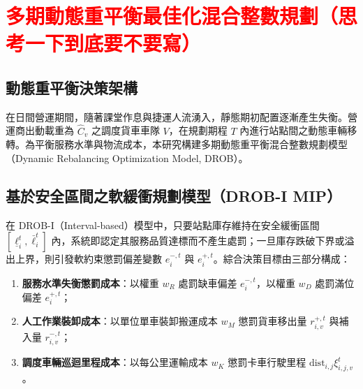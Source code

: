 \section{\textcolor{red}{多期動態重平衡最佳化混合整數規劃（思考一下到底要不要寫）}}

\subsection{動態重平衡決策架構}

在日間營運期間，隨著課堂作息與捷運人流湧入，靜態期初配置逐漸產生失衡。營運商出動載重為 $\hat{C}_v$ 之調度貨車車隊 $V$，在規劃期程 $T$ 內進行站點間之動態車輛移轉。為平衡服務水準與物流成本，本研究構建多期動態重平衡混合整數規劃模型（Dynamic Rebalancing Optimization Model, DROB）。

\subsection{基於安全區間之軟緩衝規劃模型（DROB-I MIP）}\label{subsec:drob_i_buffer}

在 DROB-I（Interval-based）模型中，只要站點庫存維持在安全緩衝區間 $[\underline{\ell}^t_i, \bar{\ell}^t_i]$ 內，系統即認定其服務品質達標而不產生處罰；一旦庫存跌破下界或溢出上界，則引發軟約束懲罰偏差變數 $e^{-, t}_i$ 與 $e^{+, t}_i$。綜合決策目標由三部分構成：
\begin{enumerate}
    \item \textbf{服務水準失衡懲罰成本}：以權重 $w_R$ 處罰缺車偏差 $e^{-, t}_i$，以權重 $w_D$ 處罰滿位偏差 $e^{+, t}_i$；
    \item \textbf{人工作業裝卸成本}：以單位單車裝卸搬運成本 $w_M$ 懲罰貨車移出量 $r^{+, t}_{i,v}$ 與補入量 $r^{-, t}_{i,v}$；
    \item \textbf{調度車輛巡迴里程成本}：以每公里運輸成本 $w_K$ 懲罰卡車行駛里程 $\text{dist}_{i,j} \xi^t_{i,j,v}$。
\end{enumerate}

